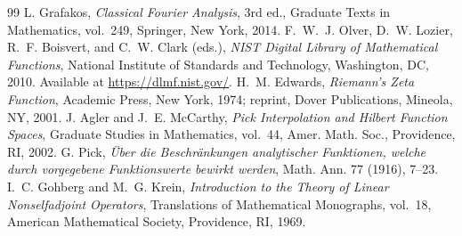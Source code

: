 \documentclass[11pt]{article}
\theoremstyle{definition}
\theoremstyle{remark}
\theoremstyle{definition}
\begin{document}
\begin{thebibliography}{99}
 L. Grafakos, \emph{Classical Fourier Analysis}, 3rd ed., Graduate Texts in Mathematics, vol.~249, Springer, New York, 2014.
 F.~W.~J. Olver, D.~W. Lozier, R.~F. Boisvert, and C.~W. Clark (eds.), \emph{NIST Digital Library of Mathematical Functions}, National Institute of Standards and Technology, Washington, DC, 2010. Available at \url{https://dlmf.nist.gov/}.
 H.~M. Edwards, \emph{Riemann's Zeta Function}, Academic Press, New York, 1974; reprint, Dover Publications, Mineola, NY, 2001.
 J. Agler and J.~E. McCarthy, \emph{Pick Interpolation and Hilbert Function Spaces}, Graduate Studies in Mathematics, vol.~44, Amer. Math. Soc., Providence, RI, 2002.
 G. Pick, \emph{Über die Beschränkungen analytischer Funktionen, welche durch vorgegebene Funktionswerte bewirkt werden}, Math. Ann. 77 (1916), 7--23.
 I.~C. Gohberg and M.~G. Krein, \emph{Introduction to the Theory of Linear Nonselfadjoint Operators}, Translations of Mathematical Monographs, vol.~18, American Mathematical Society, Providence, RI, 1969.
\end{thebibliography}
\end{document}
